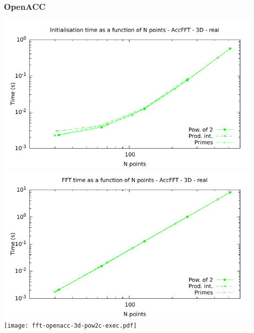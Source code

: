 \documentclass[12pt, a4paper]{article}
\begin{document}
\subsubsection{OpenACC}
\includegraphics[height=8cm]{graphs/fft-openacc-3d-pow2-r-init.pdf}\\
\includegraphics[height=8cm]{graphs/fft-openacc-3d-pow2-r-exec.pdf}\\
\texttt{[image: fft-openacc-3d-pow2c-exec.pdf]}\\
\end{document}
